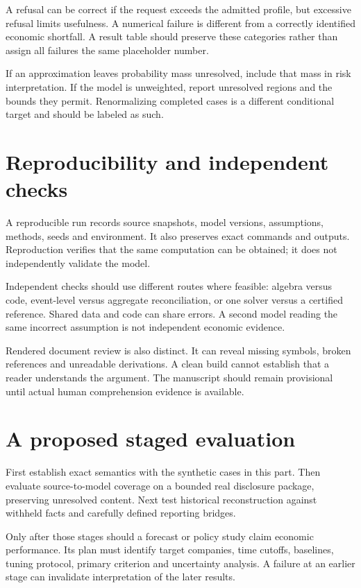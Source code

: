 A refusal can be correct if the request exceeds the admitted profile, but excessive refusal limits usefulness. A numerical failure is different from a correctly identified economic shortfall. A result table should preserve these categories rather than assign all failures the same placeholder number.

If an approximation leaves probability mass unresolved, include that mass in risk interpretation. If the model is unweighted, report unresolved regions and the bounds they permit. Renormalizing completed cases is a different conditional target and should be labeled as such.

\section{Reproducibility and independent checks}
A reproducible run records source snapshots, model versions, assumptions, methods, seeds and environment. It also preserves exact commands and outputs. Reproduction verifies that the same computation can be obtained; it does not independently validate the model.

Independent checks should use different routes where feasible: algebra versus code, event-level versus aggregate reconciliation, or one solver versus a certified reference. Shared data and code can share errors. A second model reading the same incorrect assumption is not independent economic evidence.

Rendered document review is also distinct. It can reveal missing symbols, broken references and unreadable derivations. A clean build cannot establish that a reader understands the argument. The manuscript should remain provisional until actual human comprehension evidence is available.

\section{A proposed staged evaluation}
First establish exact semantics with the synthetic cases in this part. Then evaluate source-to-model coverage on a bounded real disclosure package, preserving unresolved content. Next test historical reconstruction against withheld facts and carefully defined reporting bridges.

Only after those stages should a forecast or policy study claim economic performance. Its plan must identify target companies, time cutoffs, baselines, tuning protocol, primary criterion and uncertainty analysis. A failure at an earlier stage can invalidate interpretation of the later results.

